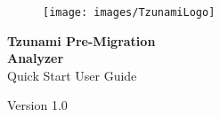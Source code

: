\pagestyle{empty}
\begin{figure}[tp] %
\texttt{[image: images/TzunamiLogo]}
\end{figure}
\begin{flushright}  
	\vspace*{\fill}
	 \textcolor{coverTextColor}{\huge \textbf{Tzunami Pre-Migration}}\\
	 \textcolor{coverTextColor}{\huge \textbf{{Analyzer}\\}}  
	Quick Start User Guide
	\vspace*{\fill}
\par

\end{flushright}
\begin{center} 
{\Large\vspace*{2mm} \par\vspace*{4mm} \vspace*{3mm}\large Version 1.0}\par %
\end{center} 
 